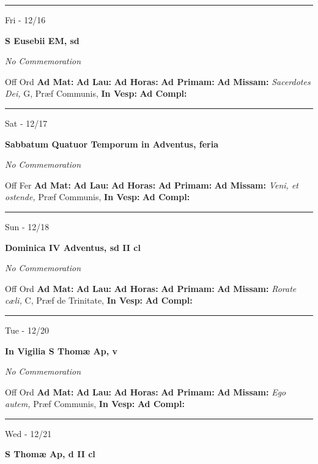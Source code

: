 \documentclass[letterpaper, 10pt]{article}
\begin{document}
\hrule
\begin{center}
Fri - 12/16
\end{center}\textbf{ \large S Eusebii EM, \textnormal{\normalsize sd}}

\textit{No Commemoration}\begin{justify}
Off Ord
\textbf{Ad Mat: }
\textbf{Ad Lau: }
\textbf{Ad Horas: }
\textbf{Ad Primam: }
\textbf{Ad Missam:} \textit{Sacerdotes Dei, } G, Præf Communis, 
\textbf{In Vesp: }
\textbf{Ad Compl: }\end{justify}



\hrule
\begin{center}
Sat - 12/17
\end{center}\textbf{ \large Sabbatum Quatuor Temporum in Adventus, \textnormal{\normalsize feria}}

\textit{No Commemoration}\begin{justify}
Off Fer
\textbf{Ad Mat: }
\textbf{Ad Lau: }
\textbf{Ad Horas: }
\textbf{Ad Primam: }
\textbf{Ad Missam:} \textit{Veni, et ostende, } Præf Communis, 
\textbf{In Vesp: }
\textbf{Ad Compl: }\end{justify}



\hrule
\begin{center}
Sun - 12/18
\end{center}\textbf{ \large Dominica IV Adventus, \textnormal{\normalsize sd II cl}}

\textit{No Commemoration}\begin{justify}
Off Ord
\textbf{Ad Mat: }
\textbf{Ad Lau: }
\textbf{Ad Horas: }
\textbf{Ad Primam: }
\textbf{Ad Missam:} \textit{Rorate cæli, } C, Præf de Trinitate, 
\textbf{In Vesp: }
\textbf{Ad Compl: }\end{justify}



\hrule
\begin{center}
Tue - 12/20
\end{center}\textbf{ \large In Vigilia S Thomæ Ap, \textnormal{\normalsize v}}

\textit{No Commemoration}\begin{justify}
Off Ord
\textbf{Ad Mat: }
\textbf{Ad Lau: }
\textbf{Ad Horas: }
\textbf{Ad Primam: }
\textbf{Ad Missam:} \textit{Ego autem, } Præf Communis, 
\textbf{In Vesp: }
\textbf{Ad Compl: }\end{justify}



\hrule
\begin{center}
Wed - 12/21
\end{center}\textbf{ \large S Thomæ Ap, \textnormal{\normalsize d II cl}}
\end{document}
